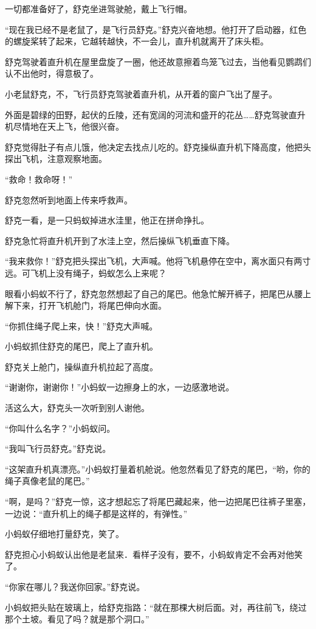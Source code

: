 \documentclass[a4paper,12pt,UTF8,twoside]{ctexbook}
\begin{document}
一切都准备好了，舒克坐进驾驶舱，戴上飞行帽。

“现在我已经不是老鼠了，是飞行员舒克。”舒克兴奋地想。他打开了启动器，红色的螺旋桨转了起来，它越转越快，不一会儿，直升机就离开了床头柜。

舒克驾驶着直升机在屋里盘旋了一圈，他还故意擦着鸟笼飞过去，当他看见鹦鹉们认不出他时，得意极了。

小老鼠舒克，不，飞行员舒克驾驶着直升机，从开着的窗户飞出了屋子。

外面是碧绿的田野，起伏的丘陵，还有宽阔的河流和盛开的花丛……舒克驾驶直升机尽情地在天上飞，他很兴奋。

舒克觉得肚子有点儿饿，他决定去找点儿吃的。舒克操纵直升机下降高度，他把头探出飞机，注意观察地面。

“救命！救命呀！”

舒克忽然听到地面上传来呼救声。

舒克一看，是一只蚂蚁掉进水洼里，他正在拼命挣扎。

舒克急忙将直升机开到了水洼上空，然后操纵飞机垂直下降。

“我来救你！”舒克把头探出飞机，大声喊。他将飞机悬停在空中，离水面只有两寸远。可飞机上没有绳子，蚂蚁怎么上来呢？

眼看小蚂蚁不行了，舒克忽然想起了自己的尾巴。他急忙解开裤子，把尾巴从腰上解下来，打开飞机舱门，将尾巴伸向水面。

“你抓住绳子爬上来，快！”舒克大声喊。

小蚂蚁抓住舒克的尾巴，爬上了直升机。

舒克关上舱门，操纵直升机拉起了高度。

“谢谢你，谢谢你！”小蚂蚁一边擦身上的水，一边感激地说。

活这么大，舒克头一次听到别人谢他。

“你叫什么名字？”小蚂蚁问。

“我叫飞行员舒克。”舒克说。

“这架直升机真漂亮。”小蚂蚁打量着机舱说。他忽然看见了舒克的尾巴，“哟，你的绳子真像老鼠的尾巴。”

“啊，是吗？”舒克一惊，这才想起忘了将尾巴藏起来，他一边把尾巴往裤子里塞，一边说：“直升机上的绳子都是这样的，有弹性。”

小蚂蚁仔细地打量舒克，笑了。

舒克担心小蚂蚁认出他是老鼠来．看样子没有，要不，小蚂蚁肯定不会再对他笑了。

“你家在哪儿？我送你回家。”舒克说。

小蚂蚁把头贴在玻璃上，给舒克指路：“就在那棵大树后面。对，再往前飞，绕过那个土坡。看见了吗？就是那个洞口。”
\end{document}
